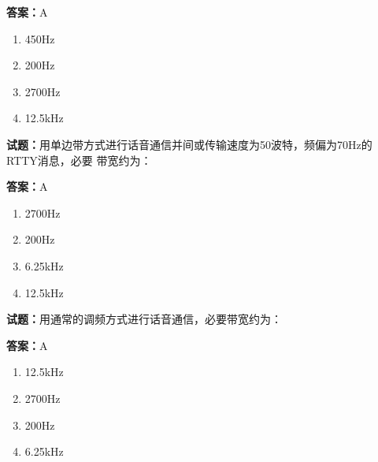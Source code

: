 \documentclass{ctexbook}
\begin{document}
\textbf{答案：}A 

\begin{enumerate}[leftmargin=3em]
  \item 450Hz 

  \item 200Hz 

  \item 2700Hz 

  \item 12.5kHz 

\end{enumerate}





\vspace{1em}

\textbf{试题：}用单边带方式进行话音通信并间或传输速度为50波特，频偏为70Hz的RTTY消息，必要
带宽约为： 

\textbf{答案：}A 

\begin{enumerate}[leftmargin=3em]
  \item 2700Hz 

  \item 200Hz 

  \item 6.25kHz 

  \item 12.5kHz 

\end{enumerate}






\vspace{1em}

\textbf{试题：}用通常的调频方式进行话音通信，必要带宽约为： 

\textbf{答案：}A 

\begin{enumerate}[leftmargin=3em]
  \item 12.5kHz 

  \item 2700Hz 

  \item 200Hz 

  \item 6.25kHz 

\end{enumerate}
\end{document}
